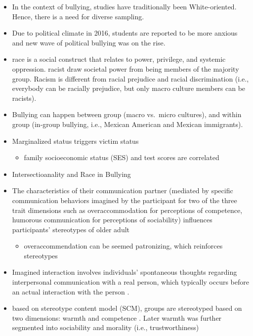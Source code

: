 \documentclass[
]{book}
\providecommand{\tightlist}{%
  \setlength{\itemsep}{0pt}\setlength{\parskip}{0pt}}
\begin{document}
\citep{Harris_2018}

\begin{itemize}
\item
  In the context of bullying, studies have traditionally been White-oriented. Hence, there is a need for diverse
  sampling.
\item
  Due to political climate in 2016, students are reported to be more anxious and new wave of political bullying was on
  the rise.
\item
  race is a social construct that relates to power, privilege, and systemic oppression. racist draw societal power
  from being members of the majority group. Racism is different from racial prejudice and racial discrimination (i.e.,
  everybody can be racially prejudice, but only macro culture members can be racists).
\item
  Bullying can happen between group (macro vs.~micro cultures), and within group (in-group bullying, i.e., Mexican
  American and Mexican immigrants).
\item
  Marginalized status triggers victim status

  \begin{itemize}
  \tightlist
  \item
    family socioeconomic status (SES) and test scores are correlated
  \end{itemize}
\item
  Intersectioanality and Race in Bullying
\end{itemize}

\citep{Chen_2016}

\begin{itemize}
\item
  The characteristics of their communication partner (mediated by specific communication behaviors imagined by the
  participant for two of the three trait dimensions such as overaccommodation for perceptions of competence, humorous
  communication for perceptions of sociability) influences participants' stereotypes of older adult

  \begin{itemize}
  \tightlist
  \item
    overaccommendation can be seemed patronizing, which reinforces stereotypes
  \end{itemize}
\item
  Imagined interaction involves individuals' spontaneous thoughts regarding interpersonal communication with a real
  person, which typically occurs before an actual interaction with the person \citep{Honeycutt_2014}.
\item
  based on stereotype content model (SCM), groups are stereotyped based on two dimensions: warmth and competence
  \citep{Fiske_2007}. Later warmth was further segmented into sociability and morality (i.e., trustworthiness)
\end{itemize}
\end{document}
